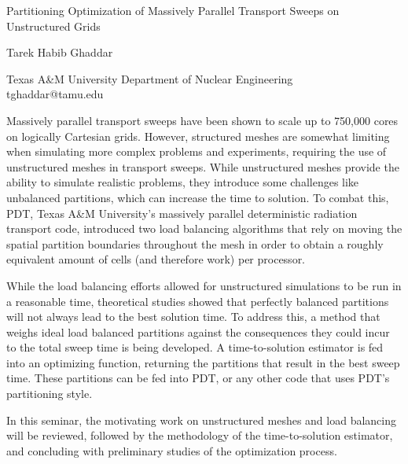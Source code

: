 \documentclass[a4paper]{article}
\begin{document}

\Large
 \begin{center}
Partitioning Optimization of Massively Parallel Transport Sweeps on Unstructured Grids\\ 

\hspace{10pt}

\large
Tarek Habib Ghaddar\\

\hspace{10pt}

\small  
Texas A\&M University Department of Nuclear Engineering\\
tghaddar@tamu.edu\\

\end{center}

\hspace{10pt}

\normalsize
Massively parallel transport sweeps have been shown to scale up to 750,000 cores on logically Cartesian grids. However, structured meshes are somewhat limiting when  simulating more complex problems and experiments, requiring the use of unstructured meshes in transport sweeps. While unstructured meshes provide the ability to simulate realistic problems, they introduce some challenges like unbalanced partitions, which can increase the time to solution. To combat this, PDT, Texas A\&M University's massively parallel deterministic radiation transport code, introduced two load balancing algorithms that rely on moving the spatial partition boundaries throughout the mesh in order to obtain a roughly equivalent amount of cells (and therefore work) per processor.

While the load balancing efforts allowed for unstructured simulations to be run in a reasonable time, theoretical studies showed that perfectly balanced partitions will not always lead to the best solution time. To address this, a method that weighs ideal load balanced partitions against the consequences they could incur to the total sweep time is being developed. A time-to-solution estimator is fed into an optimizing function, returning the partitions that result in the best sweep time. These partitions can be fed into PDT, or any other code that uses PDT's partitioning style. 

In this seminar, the motivating work on unstructured meshes and load balancing will be reviewed, followed by the methodology of the time-to-solution estimator, and concluding with preliminary studies of the optimization process. 
\end{document}
